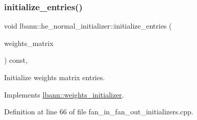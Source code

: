 \subsubsection{\texorpdfstring{initialize\+\_\+entries()}{initialize\_entries()}}
{\footnotesize\ttfamily void lbann\+::he\+\_\+normal\+\_\+initializer\+::initialize\+\_\+entries (\begin{DoxyParamCaption}\item[{\hyperlink{base_8hpp_a9a697a504ae84010e7439ffec862b470}{Abs\+Dist\+Mat} \&}]{weights\+\_\+matrix }\end{DoxyParamCaption}) const\hspace{0.3cm}{\ttfamily [override]}, {\ttfamily [virtual]}}

Initialize weights matrix entries. 

Implements \hyperlink{classlbann_1_1weights__initializer_a2ad6acf904c0c7bc7406dbd9851107be}{lbann\+::weights\+\_\+initializer}.



Definition at line 66 of file fan\+\_\+in\+\_\+fan\+\_\+out\+\_\+initializers.\+cpp.


